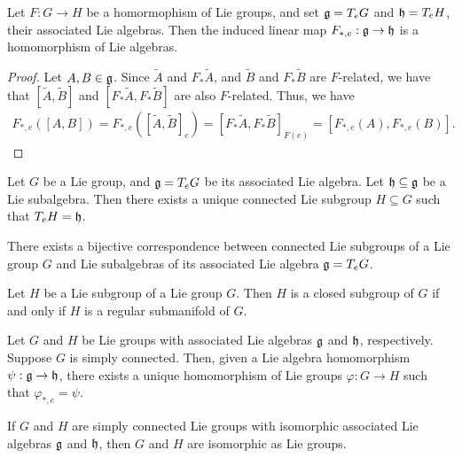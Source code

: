 \begin{proposition}
    Let $F:G \to H$ be a homormophism of Lie groups, and set $\mathfrak{g} = T_{e}G$ and $\mathfrak{h} = T_{e}H$, their associated Lie algebras. Then the induced linear map $F_{\ast,e}:\mathfrak{g} \to \mathfrak{h}$ is a homomorphism of Lie algebras.
\end{proposition}
\begin{proof}
    Let $A,B \in \mathfrak{g}$. Since $\tilde{A}$ and $F_{\ast}\tilde{A}$, and $\tilde{B}$ and $F_{\ast}\tilde{B}$ are $F$-related, we have that $[\tilde{A},\tilde{B}]$ and $[F_{\ast}\tilde{A},F_{\ast}\tilde{B}]$ are also $F$-related. Thus, we have
    \begin{align}
        F_{\ast,e}([A,B]) = F_{\ast,e}([\tilde{A},\tilde{B}]_{e}) = [F_{\ast}\tilde{A},F_{\ast}\tilde{B}]_{F(e)} = [F_{\ast,e}(A),F_{\ast,e}(B)].
    \end{align}
\end{proof}

\begin{theorem}
    Let $G$ be a Lie group, and $\mathfrak{g} = T_{e}G$ be its associated Lie algebra. Let $\mathfrak{h} \subseteq \mathfrak{g}$ be a Lie subalgebra. Then there exists a unique connected Lie subgroup $H \subseteq G$ such that $T_{e}H = \mathfrak{h}$.
\end{theorem}

\begin{corollary}
    There exists a bijective correspondence between connected Lie subgroups of a Lie group $G$ and Lie subalgebras of its associated Lie algebra $\mathfrak{g} = T_{e}G$.
\end{corollary}

\begin{theorem}
    Let $H$ be a Lie subgroup of a Lie group $G$. Then $H$ is a closed subgroup of $G$ if and only if $H$ is a regular submanifold of $G$.
\end{theorem}

\begin{theorem}
    Let $G$ and $H$ be Lie groups with associated Lie algebras $\mathfrak{g}$ and $\mathfrak{h}$, respectively. Suppose $G$ is simply connected. Then, given a Lie algebra homomorphism $\psi:\mathfrak{g} \to \mathfrak{h}$, there exists a unique homomorphism of Lie groups $\varphi:G \to H$ such that $\varphi_{\ast,e} = \psi$.
\end{theorem}

\begin{corollary}
    If $G$ and $H$ are simply connected Lie groups with isomorphic associated Lie algebras $\mathfrak{g}$ and $\mathfrak{h}$, then $G$ and $H$ are isomorphic as Lie groups.
\end{corollary}

